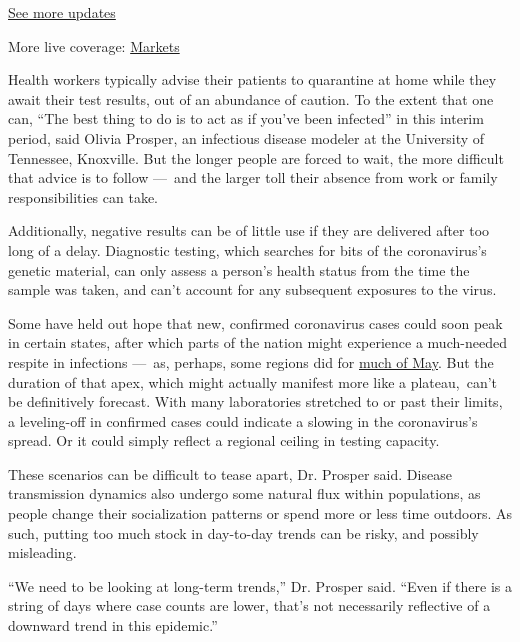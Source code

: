 \href{https://www.nytimes3xbfgragh.onion/2020/08/20/world/coronavirus-covid.html?action=click\&pgtype=Article\&state=default\&region=MAIN_CONTENT_1\&context=storylines_live_updates}{See
more updates}

More live coverage:
\href{https://www.nytimes3xbfgragh.onion/live/2020/08/20/business/stock-market-today-coronavirus?action=click\&pgtype=Article\&state=default\&region=MAIN_CONTENT_1\&context=storylines_live_updates}{Markets}

Health workers typically advise their patients to quarantine at home
while they await their test results, out of an abundance of caution. To
the extent that one can, ``The best thing to do is to act as if you've
been infected'' in this interim period, said Olivia Prosper, an
infectious disease modeler at the University of Tennessee, Knoxville.
But the longer people are forced to wait, the more difficult that advice
is to follow ---~and the larger toll their absence from work or family
responsibilities can take.

Additionally, negative results can be of little use if they are
delivered after too long of a delay. Diagnostic testing, which searches
for bits of the coronavirus's genetic material, can only assess a
person's health status from the time the sample was taken, and can't
account for any subsequent exposures to the virus.

Some have held out hope that new, confirmed coronavirus cases could soon
peak in certain states, after which parts of the nation might experience
a much-needed respite in infections ---~as, perhaps, some regions did
for \href{https://covidtracking.com/data/us-daily/}{much of May}. But
the duration of that apex, which might actually manifest more like a
plateau,~can't be definitively forecast. With many laboratories
stretched to or past their limits, a leveling-off in confirmed cases
could indicate a slowing in the coronavirus's spread. Or it could simply
reflect a regional ceiling in testing capacity.

These scenarios can be difficult to tease apart, Dr. Prosper said.
Disease transmission dynamics also undergo some natural flux within
populations, as people change their socialization patterns or spend more
or less time outdoors. As such, putting too much stock in day-to-day
trends can be risky, and possibly misleading.

``We need to be looking at long-term trends,'' Dr. Prosper said. ``Even
if there is a string of days where case counts are lower, that's not
necessarily reflective of a downward trend in this epidemic.''

